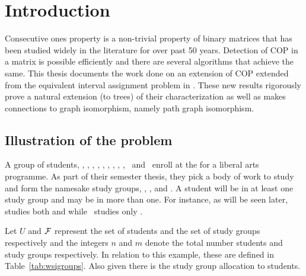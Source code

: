 \documentclass[MS,synopsis]{iitmdiss}
\title{\mythesistitle}
\author{\myname}
\date{\MakeUppercase
  {\mysynopsissubmissionmonth}}
\begin{document}
\maketitle

\setcounter{page}{0}

\section{Introduction}
\label{sec:intro}
\vspace{\secfirstparatrim} 

Consecutive ones property is a non-trivial property of binary matrices
that has been studied widely in the literature for over past 50
years. Detection of COP in a matrix is possible efficiently and there
are several algorithms that achieve the same. This thesis documents
the work done on an extension of COP extended from the equivalent
interval assignment problem in \cite{nsnrs09}. These new results
rigorously prove a natural extension (to trees) of their
characterization as well as makes connections to graph isomorphism,
namely path graph isomorphism.


\subsection{Illustration of the problem}
\label{sec:problem}
\vspace{\secfirstparatrim}

A group of students, \Pa, \Pi, \Sn, \Wo, \Vi, \Li, \Ch, \Sa, \Fr, \Sc\
and \Lu\ enroll at the {\WSI} for a liberal arts programme.  As part
of their semester thesis, they pick a body of work to study and form
the namesake study groups, {\LLL}, {\GGG}, {\BBB} and
{\TTT}. A student will be
in at least one study group and may be in more than one. For instance,
as will be seen later, {\Fr} studies both {\LLL} and {\TTT} while \Wo\
studies only \BBB.

Let $U$ and ${\cal F}$ represent the set of students and the set of study
groups respectively and the integers $n$ and $m$ denote the total
number students and study groups respectively. In relation to this
example, these are defined in Table~\ref{tab:wsigroups}. Also given
there is the study group allocation to students.
\end{document}
